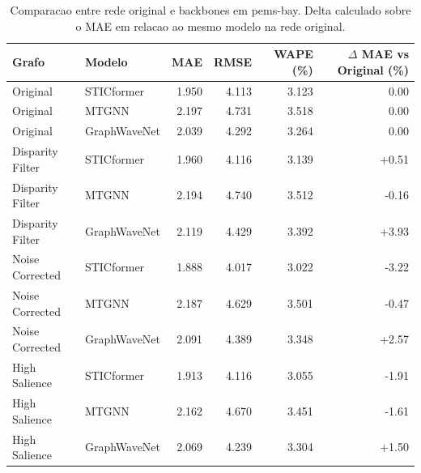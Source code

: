 \begin{table}[ht]
\centering
\caption{Comparacao entre rede original e backbones em pems-bay. Delta calculado sobre o MAE em relacao ao mesmo modelo na rede original.}
\label{tab:pems-bay-original-backbones}
\begin{tabular}{llrrrr}
\toprule
Grafo & Modelo & MAE & RMSE & WAPE (\%) & $\Delta$ MAE vs Original (\%) \\
\midrule
Original & STICformer & 1.950 & 4.113 & 3.123 & 0.00 \\
Original & MTGNN & 2.197 & 4.731 & 3.518 & 0.00 \\
Original & GraphWaveNet & 2.039 & 4.292 & 3.264 & 0.00 \\
Disparity Filter & STICformer & 1.960 & 4.116 & 3.139 & +0.51 \\
Disparity Filter & MTGNN & 2.194 & 4.740 & 3.512 & -0.16 \\
Disparity Filter & GraphWaveNet & 2.119 & 4.429 & 3.392 & +3.93 \\
Noise Corrected & STICformer & 1.888 & 4.017 & 3.022 & -3.22 \\
Noise Corrected & MTGNN & 2.187 & 4.629 & 3.501 & -0.47 \\
Noise Corrected & GraphWaveNet & 2.091 & 4.389 & 3.348 & +2.57 \\
High Salience & STICformer & 1.913 & 4.116 & 3.055 & -1.91 \\
High Salience & MTGNN & 2.162 & 4.670 & 3.451 & -1.61 \\
High Salience & GraphWaveNet & 2.069 & 4.239 & 3.304 & +1.50 \\
\bottomrule
\end{tabular}
\end{table}
